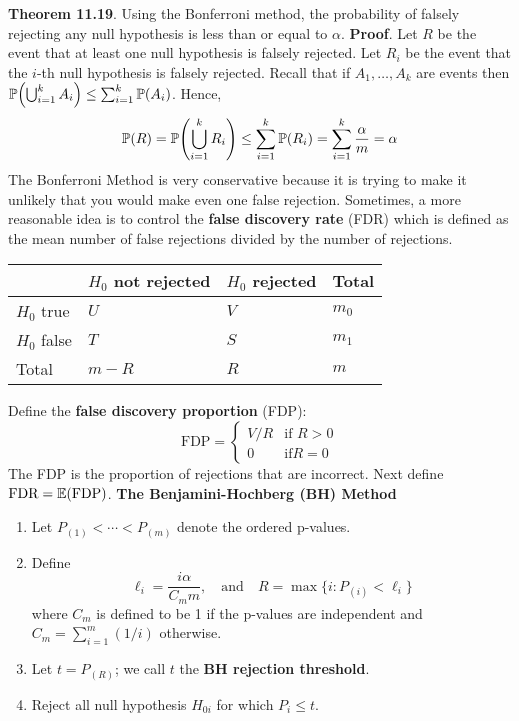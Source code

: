 \textbf{Theorem 11.19}. Using the Bonferroni method, the probability of
falsely rejecting any null hypothesis is less than or equal to
\(\alpha\).
\textbf{Proof}. Let \(R\) be the event that at least one null hypothesis
is falsely rejected. Let \(R_{i}\) be the event that the \(i\)-th null
hypothesis is falsely rejected. Recall that if \(A_{1}, \dots, A_{k}\) are
events then
\(\PROB \left( \bigcup_{i=1}^{k} A_{i} \right) \leq \sum_{i=1}^{k} \PROB(A_{i})\).
Hence,
\[
\PROB(R) = \PROB\left( \bigcup_{i=1}^{k} R_{i} \right) \leq \sum_{i=1}^{k} \PROB(R_{i}) = \sum_{i=1}^{k} \frac{\alpha}{m} = \alpha
\]
The Bonferroni Method is very conservative because it is trying to make
it unlikely that you would make even one false rejection. Sometimes, a
more reasonable idea is to control the \textbf{false discovery rate}
(FDR) which is defined as the mean number of false rejections divided by
the number of rejections.
\begin{table}[H]
\centering
\begin{tabular}{@{}llll@{}}
\toprule
& \(H_{0}\) not rejected & \(H_{0}\) rejected & Total \\
\midrule
\(H_{0}\) true & \(U\) & \(V\) & \(m_{0}\) \\
\(H_{0}\) false & \(T\) & \(S\) & \(m_{1}\) \\
Total & \(m - R\) & \(R\) & \(m\) \\
\bottomrule
\end{tabular}
\end{table}
Define the \textbf{false discovery proportion} (FDP):
\[
\text{FDP} = \begin{cases}
V / R & \text{if } R > 0\\
0     & \text{if}  R = 0
\end{cases}
\]
The FDP is the proportion of rejections that are incorrect. Next define
\(\text{FDR} = \operatorname{\mathbb{E}}(\text{FDP})\).
\textbf{The Benjamini-Hochberg (BH) Method}
\begin{enumerate}[label={\arabic*.}]
\item
  Let \(P_{(1)} < \cdots < P_{(m)}\) denote the ordered p-values.
\item
  Define
\[
\ell_{i} = \frac{i \alpha}{C_m m},
\quad \text{and} \quad
R = \max \bigg\{ i: P_{(i)} < \ell_{i} \bigg\}
\]
where \(C_m\) is defined to be 1 if the p-values are independent and
\(C_m = \sum_{i=1}^m (1/i)\) otherwise.
\end{enumerate}
\begin{enumerate}[label={\arabic*.}]
\setcounter{enumi}{2}
\item
  Let \(t = P_{(R)}\); we call \(t\) the \textbf{BH rejection
  threshold}.
\item
  Reject all null hypothesis \(H_{0i}\) for which \(P_{i} \leq t\).
\end{enumerate}

